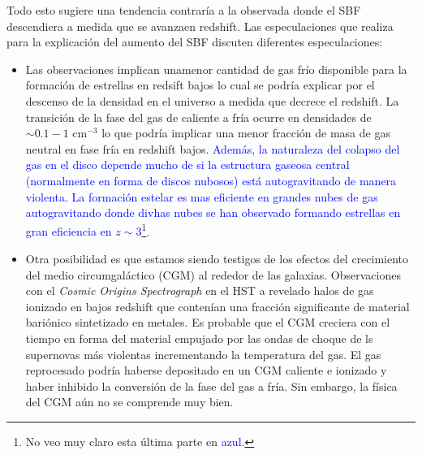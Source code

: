 \documentclass{article}
\begin{document}
Todo esto sugiere una tendencia contraría a la observada donde el SBF descendiera a medida que se avanzaen redshift. Las especulaciones que realiza \cite{finkelstein2015increasing} para la explicación del aumento del SBF discuten diferentes especulaciones:
\begin{itemize}
\item Las observaciones implican unamenor cantidad de gas frío disponible para la formación de estrellas en redsift bajos lo cual se podría explicar por el descenso de la densidad en el universo a medida que decrece el redshift. La transición de la fase del gas de caliente a fría ocurre en densidades de $\sim 0.1-1$ cm$^{-3}$ lo que podría implicar una menor fracción de masa de gas neutral en fase fría en redshift bajos. \textcolor{blue}{Además, la naturaleza del colapso del gas en el disco depende mucho de si la estructura gaseosa central (normalmente en forma de discos nubosos) está autogravitando de manera violenta. La formación estelar es mas eficiente en grandes nubes de gas autogravitando donde divhas nubes se han observado formando estrellas en gran eficiencia en $z\sim 3$}\footnote{No veo muy claro esta última parte en \textcolor{blue}{azul}.}.

\item Otra posibilidad es que estamos siendo testigos de los efectos del crecimiento del medio circumgaláctico (CGM) al rededor de las galaxias. Observaciones con el \textit{Cosmic Origins Spectrograph} en el HST a revelado halos de gas ionizado en bajos redshift que contenían una fracción significante de material bariónico sintetizado en metales. Es probable que el CGM creciera con el tiempo en forma del material empujado por las ondas de choque de ls supernovas más violentas incrementando la temperatura del gas. El gas reprocesado podría haberse depositado en un CGM caliente e ionizado y haber inhibido la conversión de la fase del gas a fría. Sin embargo, la física del CGM aún no se comprende muy bien.\\


\end{itemize}
\end{document}
